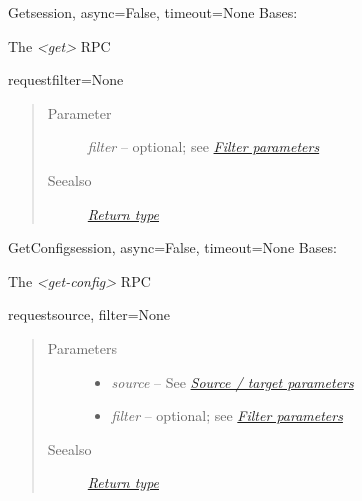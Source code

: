 \documentclass[a4paper,10pt,english]{manual}
\begin{document}
\hypertarget{ncclient.operations.Get}{}\begin{classdesc}{Get}{session, async=False, timeout=None}
Bases: \hyperlink{ncclient.operations.rpc.RPC}{}

The \emph{\textless{}get\textgreater{}} RPC

\hypertarget{ncclient.operations.Get.request}{}\begin{methoddesc}{request}{filter=None}~\begin{quote}\begin{description}
\item[Parameter]
\emph{filter} -- optional; see \hyperlink{filter}{\emph{Filter parameters}}

\item[Seealso]
\hyperlink{return}{\emph{Return type}}

\end{description}\end{quote}
\end{methoddesc}
\end{classdesc}

\hypertarget{ncclient.operations.GetConfig}{}\begin{classdesc}{GetConfig}{session, async=False, timeout=None}
Bases: \hyperlink{ncclient.operations.rpc.RPC}{}

The \emph{\textless{}get-config\textgreater{}} RPC

\hypertarget{ncclient.operations.GetConfig.request}{}\begin{methoddesc}{request}{source, filter=None}~\begin{quote}\begin{description}
\item[Parameters]\begin{itemize}
\item {} 
\emph{source} -- See \hyperlink{source-target}{\emph{Source / target parameters}}

\item {} 
\emph{filter} -- optional; see \hyperlink{filter}{\emph{Filter parameters}}

\end{itemize}

\item[Seealso]
\hyperlink{return}{\emph{Return type}}

\end{description}\end{quote}
\end{methoddesc}
\end{classdesc}
\end{document}
